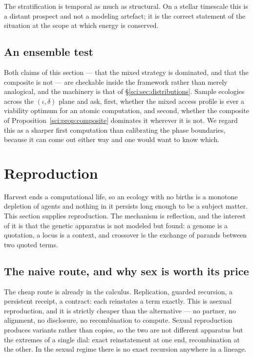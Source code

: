 The stratification is temporal as much as structural. On a stellar timescale this is a distant
prospect and not a modeling artefact; it is the correct statement of the situation at the scope at
which energy is conserved.

\subsection{An ensemble test}\label{sci:S11.7}

Both claims of this section --- that the mixed strategy is dominated, and that the composite is not
--- are checkable inside the framework rather than merely analogical, and the machinery is that of
\S\ref{sci:sec:distributions}. Sample ecologies across the $(\iota, \delta)$ plane and ask, first, whether
the mixed access profile is ever a viability optimum for an atomic computation, and second, whether the
composite of Proposition~\ref{sci:prop:composite} dominates it wherever it is not. We regard this as a
sharper first computation than calibrating the phase boundaries, because it can come out either way
and one would want to know which.

\section{Reproduction}\label{sci:S12}
\label{sci:sec:repro}

Harvest ends a computational life, so an ecology with no births is a monotone depletion of agents and
nothing in it persists long enough to be a subject matter. This section supplies reproduction. The
mechanism is reflection, and the interest of it is that the genetic apparatus is not modeled but
found: a genome is a quotation, a locus is a context, and crossover is the exchange of parands between
two quoted terms.

\subsection{The naive route, and why sex is worth its price}\label{sci:S12.1}

The cheap route is already in the calculus. Replication, guarded recursion, a persistent receipt, a
contract: each reinstates a term exactly. This is asexual reproduction, and it is strictly cheaper
than the alternative --- no partner, no alignment, no disclosure, no recombination to compute.
Sexual reproduction produces variants rather than copies, so the two are not different apparatus but
the extremes of a single dial: exact reinstatement at one end, recombination at the other. In the
sexual regime there is no exact recursion anywhere in a lineage.

